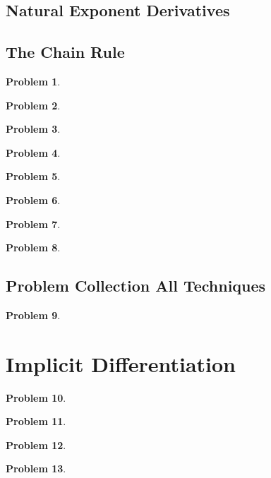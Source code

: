 \documentclass{article}
\newtheorem{problem}{Problem}
\begin{document}
\subsection{Natural Exponent Derivatives}


\subsection{The Chain Rule}
\begin{problem}

\end{problem}
\begin{problem}

\end{problem}
\begin{problem}

\end{problem}
\begin{problem}

\end{problem}
\begin{problem}

\end{problem}
\begin{problem}

\end{problem}
\begin{problem}

\end{problem}
\begin{problem}

\end{problem}
\subsection{Problem Collection All Techniques}
\begin{problem}

\end{problem}


\section{Implicit Differentiation}
\begin{problem}

\end{problem}
\begin{problem}

\end{problem}
\begin{problem}

\end{problem}
\begin{problem}

\end{problem}
\end{document}
